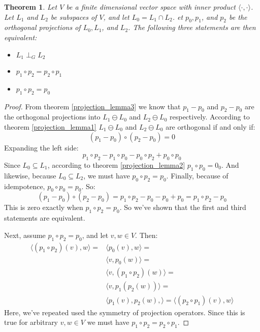 \documentclass[12pt, a4paper]{article}
\newtheorem{theorem}{Theorem}[section]
\numberwithin{equation}{section}
\begin{document}
\begin{theorem}
\label{projection_lemma4}
Let $V$ be a finite dimensional vector space with inner product $\langle\cdot,\cdot\rangle$. Let $L_1$ and $L_2$ be subspaces of $V$, and let $L_0=L_1\cap L_2$. et $p_0, p_1$, and $p_2$ be the orthogonal projections of $L_0, L_1$, and $L_2$. The following three statements are then equivalent:
\begin{itemize}
\item $L_1\perp_G L_2$
\item $p_1\circ p_2=p_2\circ p_1$
\item $p_1\circ p_2=p_0$
\end{itemize}
\end{theorem}
\begin{proof}
From theorem \ref{projection_lemma3} we know that $p_1-p_0$ and $p_2-p_0$ are the orthogonal projections into $L_1\ominus L_0$ and $L_2\ominus L_0$ respectively. According to theorem \ref{projection_lemma1} $L_1\ominus L_0$ and $L_2\ominus L_0$ are orthogonal if and only if:
\begin{equation}
(p_1-p_0)\circ(p_2-p_0)=0
\end{equation}
Expanding the left side:
\begin{equation}
p_1\circ p_2-p_1\circ p_0-p_0\circ p_2+p_0\circ p_0
\end{equation}
Since $L_0\subseteq L_1$, according to theorem \ref{projection_lemma2} $p_1\circ p_0=0_0$. And likewise, because $L_0\subseteq L_2$, we must have $p_0\circ p_2=p_0$. Finally, because of idempotence, $p_0\circ p_0=p_0$. So:
\begin{equation}
(p_1-p_0)\circ(p_2-p_0)=p_1\circ p_2-p_0-p_0+p_0=p_1\circ p_2-p_0
\end{equation}
This is zero exactly when $p_1\circ p_2=p_0$. So we've shown that the first and third statements are equivalent.

Next, assume $p_1\circ p_2=p_0$, and let $v, w\in V$. Then:
\begin{align}
\langle (p_1\circ p_2)(v),w\rangle=&\langle p_0(v),w\rangle=\\
&\langle v,p_0(w)\rangle=\\
&\langle v,(p_1\circ p_2)(w)\rangle=\\
&\langle v,p_1(p_2(w))\rangle=\\
&\langle p_1(v),p_2(w),\rangle=\langle (p_2\circ p_1)(v),w\rangle
\end{align}
Here, we've repeated used the symmetry of projection operators. Since this is true for arbitrary $v,w\in V$ we must have $p_1\circ p_2=p_2\circ p_1$.


\end{proof}
\end{document}
